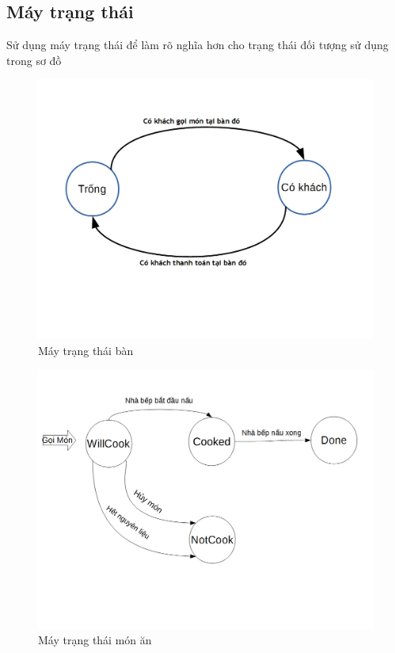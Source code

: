 \documentclass[a4paper,12pt]{report}
\begin{document}
\subsection{Máy trạng thái}
Sử dụng máy trạng thái để làm rõ nghĩa hơn cho trạng thái đối tượng sử dụng trong sơ đồ
\begin{figure}[H]
\centering
\includegraphics[scale=0.5]{FSM_ban.png}
\caption{Máy trạng thái bàn}
\end{figure}

\begin{figure}[H]
\centering
\includegraphics[scale=0.5]{FSM_monan.png}
\caption{Máy trạng thái món ăn}
\end{figure}
\end{document}
